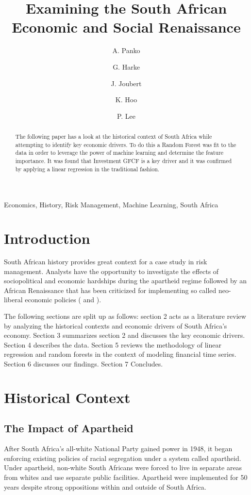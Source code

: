 \documentclass{elsarticle}
\begin{document}
  
\begin{frontmatter}
\title{Examining the South African Economic and Social Renaissance}


\author{A. Panko}
\author{G. Harke}
\author{J. Joubert}
\author{K. Hoo}
\author{P. Lee}

\begin{abstract}
The following paper has a look at the historical context of South Africa while attempting to identify key economic drivers. To do this a Random Forest was fit to the data in order to leverage the power of machine learning and determine the feature importance. It was found that Investment GFCF is a key driver and it was confirmed by applying a linear regression in the traditional fashion. 
\end{abstract}

\begin{keyword}
Economics, History, Risk Management, Machine Learning, South Africa
\end{keyword}
\end{frontmatter}

\section{Introduction}
South African history provides great context for a case study in risk management. Analysts have the opportunity to investigate the effects of sociopolitical and economic hardships during the apartheid regime followed by an African Renaissance that has been criticized for implementing so called neo-liberal economic policies (\cite{Mbeki2016a} and \cite{Mbeki2016b}). 

The following sections are split up as follows: section 2 acts as a literature review by analyzing the historical contexts and economic drivers of South Africa's economy. Section 3 summarizes section 2 and discusses the key economic drivers. Section 4 describes the data. Section 5 reviews the methodology of linear regression and random forests in the context of modeling financial time series. Section 6 discusses our findings. Section 7 Concludes.

\section{Historical Context}

\subsection{The Impact of Apartheid}
After South Africa's all-white National Party gained power in 1948, it began enforcing existing policies of racial segregation under a system called apartheid. Under apartheid, non-white South Africans were forced to live in separate areas from whites and use separate public facilities. Apartheid were implemented for 50 years despite strong oppositions within and outside of South Africa.
\end{document}
